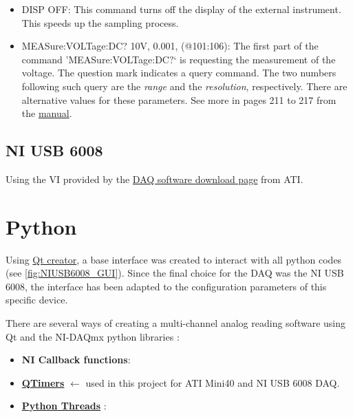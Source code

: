 \documentclass[a4paper]{article}
\begin{document}
\begin{itemize}
	\item DISP OFF: This command turns off the display of the external instrument. This speeds up the sampling process.
	\item MEASure:VOLTage:DC? 10V, 0.001, (@101:106): The first part of the command 'MEASure:VOLTage:DC$?$` is requesting the measurement of the voltage. The question mark indicates a query command. The two numbers following such query are the \textit{range} and the \textit{resolution}, respectively. There are alternative values for these parameters. See more in pages 211 to 217 from the \hyperref{https://www.manualsbase.com/manual/439362/switch/hp_(hewlett-packard)/hp_34970a/}{category}{name}{manual}.
\end{itemize}

\subsection{NI USB 6008}

Using the VI provided by the \hyperref{https://www.ati-ia.com/products/ft/software/daq_software.aspx}{category}{name}{DAQ software download page} from ATI.


\section{Python}

Using \hyperref{https://www.qt.io/product/development-tools}{category}{name}{Qt creator}, a base interface was created to interact with all python codes (see \autoref{fig:NIUSB6008_GUI}). Since the final choice for the DAQ was the NI USB 6008, the interface has been adapted to the configuration parameters of this specific device.

There are several ways of creating a multi-channel analog reading software using Qt and the NI-DAQmx python libraries \cite{goncalo}:

\begin{itemize}
	\item \textbf{NI Callback functions}: 
	\item \textbf{\hyperref{https://doc.qt.io/qt-6/qtimer.html}{category}{name}{QTimers}} $\leftarrow$ used in this project for ATI Mini40 and NI USB 6008 DAQ.
	\item \textbf{\hyperref{https://realpython.com/intro-to-python-threading/}{category}{name}{Python Threads}} :
\end{itemize}
\end{document}
